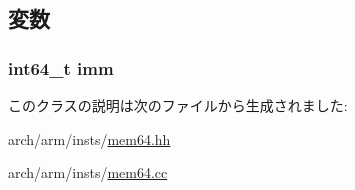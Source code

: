 \subsection{変数}
\hypertarget{classArmISA_1_1MemoryLiteral64_a11b34c3ceec32cc1f14d0ca9c099c470}{
\subsubsection[{imm}]{\setlength{\rightskip}{0pt plus 5cm}int64\_\-t {\bf imm}}}
\label{classArmISA_1_1MemoryLiteral64_a11b34c3ceec32cc1f14d0ca9c099c470}


このクラスの説明は次のファイルから生成されました:\begin{DoxyCompactItemize}
\item 
arch/arm/insts/\hyperlink{mem64_8hh}{mem64.hh}\item 
arch/arm/insts/\hyperlink{mem64_8cc}{mem64.cc}\end{DoxyCompactItemize}

